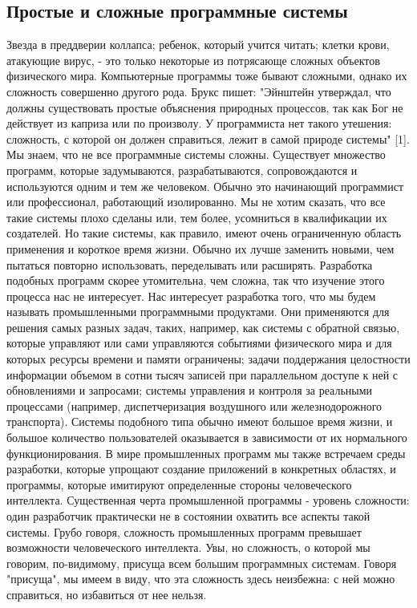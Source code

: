 \documentclass[11pt]{article}
\begin{document}
    	\subsection{Простые и сложные программные системы }
   \normalsize 	Звезда в преддверии коллапса; ребенок, который учится читать; клетки крови, атакующие вирус, - это только некоторые из потрясающе сложных объектов физического мира. Компьютерные программы тоже бывают сложными, однако их сложность совершенно другого рода. Брукс пишет: "Эйнштейн утверждал, что должны существовать простые объяснения природных процессов, так как Бог не действует из каприза или по произволу. У программиста нет такого утешения: сложность, с которой он должен справиться, лежит в самой природе системы" [1]. 
Мы знаем, что не все программные системы сложны. Существует множество программ, которые задумываются, разрабатываются, сопровождаются и используются одним и тем же человеком. Обычно это начинающий программист или профессионал, работающий изолированно. Мы не хотим сказать, что все такие системы плохо сделаны или, тем более, усомниться в квалификации их создателей. Но такие системы, как правило, имеют очень ограниченную область применения и короткое время жизни. Обычно их лучше заменить новыми, чем пытаться повторно использовать, переделывать или расширять. Разработка подобных программ скорее утомительна, чем сложна, так что изучение этого процесса нас не интересует. 
Нас интересует разработка того, что мы будем называть промышленными программными продуктами. Они применяются для решения самых разных задач, таких, например, как системы с обратной связью, которые управляют или сами управляются событиями физического мира и для которых ресурсы времени и памяти ограничены; задачи поддержания целостности информации объемом в сотни тысяч записей при параллельном доступе к ней с обновлениями и запросами; системы управления и контроля за реальными процессами (например, диспетчеризация воздушного или железнодорожного транспорта). Системы подобного типа обычно имеют большое время жизни, и большое количество пользователей оказывается в зависимости от их нормального функционирования. В мире промышленных программ мы также встречаем среды разработки, которые упрощают создание приложений в конкретных областях, и программы, которые имитируют определенные стороны человеческого интеллекта. 
Существенная черта промышленной программы - уровень сложности: один разработчик практически не в состоянии охватить все аспекты такой системы. Грубо говоря, сложность промышленных программ превышает возможности человеческого интеллекта. Увы, но сложность, о которой мы говорим, по-видимому, присуща всем большим программных системам. Говоря "присуща", мы имеем в виду, что эта сложность здесь неизбежна: с ней можно справиться, но избавиться от нее нельзя. 
\end{document}
